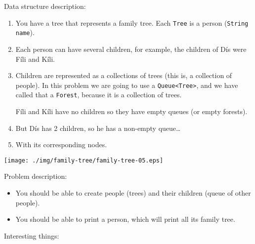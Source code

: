 \documentclass[a4paper, 9pt]{extarticle}
\begin{document}
Data structure description:

\begin{multicols}{2}
\begin{enumerate}

  \item You have a tree that represents a family tree. Each \texttt{Tree} is a
    person (\texttt{String name}).

  \item Each person can have several children, for example, the children of Dís were Fíli and Kíli.

  \item Children are represented as a collections of trees (this is, a
    collection of people). In this problem we are going to use a
    \texttt{Queue<Tree>}, and we have called that a \texttt{Forest}, because it
    is a collection of trees.

    Fíli and Kíli have no children so they have empty queues (or empty forests).

  \item But Dís has 2 children, so he has a non-empty queue\ldots

  \item With its corresponding nodes.

\end{enumerate}

\columnbreak

\begin{center}
\texttt{[image: ./img/family-tree/family-tree-05.eps]}
\end{center}

\end{multicols}

Problem description:

\begin{itemize}

  \item You should be able to create people (trees) and their children (queue
    of other people).

  \item You should be able to print a person, which will print all its family
    tree.

\end{itemize}


Interesting things:
\end{document}
